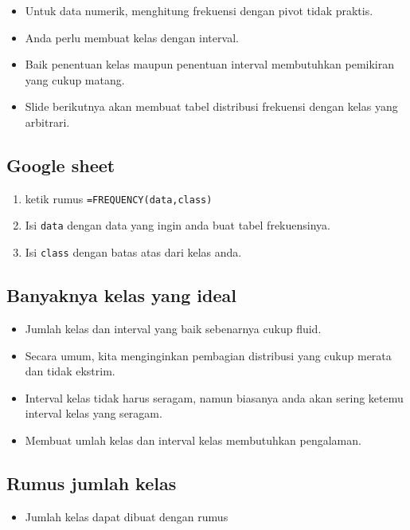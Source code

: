 \documentclass[
  letterpaper,
  DIV=11,
  numbers=noendperiod]{scrartcl}
\providecommand{\tightlist}{%
  \setlength{\itemsep}{0pt}\setlength{\parskip}{0pt}}\usepackage{longtable,booktabs,array}
\begin{document}
\begin{itemize}
\item
  Untuk data numerik, menghitung frekuensi dengan pivot tidak praktis.
\item
  Anda perlu membuat kelas dengan interval.
\item
  Baik penentuan kelas maupun penentuan interval membutuhkan pemikiran
  yang cukup matang.
\item
  Slide berikutnya akan membuat tabel distribusi frekuensi dengan kelas
  yang arbitrari.
\end{itemize}

\subsection{Google sheet}\label{google-sheet-2}

\begin{enumerate}
\def\labelenumi{\arabic{enumi}.}
\tightlist
\item
  ketik rumus \texttt{=FREQUENCY(data,class)}
\item
  Isi \texttt{data} dengan data yang ingin anda buat tabel frekuensinya.
\item
  Isi \texttt{class} dengan batas atas dari kelas anda.
\end{enumerate}

\subsection{Banyaknya kelas yang
ideal}\label{banyaknya-kelas-yang-ideal}

\begin{itemize}
\item
  Jumlah kelas dan interval yang baik sebenarnya cukup fluid.
\item
  Secara umum, kita menginginkan pembagian distribusi yang cukup merata
  dan tidak ekstrim.
\item
  Interval kelas tidak harus seragam, namun biasanya anda akan sering
  ketemu interval kelas yang seragam.
\item
  Membuat umlah kelas dan interval kelas membutuhkan pengalaman.
\end{itemize}

\subsection{Rumus jumlah kelas}\label{rumus-jumlah-kelas}

\begin{itemize}
\tightlist
\item
  Jumlah kelas dapat dibuat dengan rumus
\end{itemize}
\end{document}

